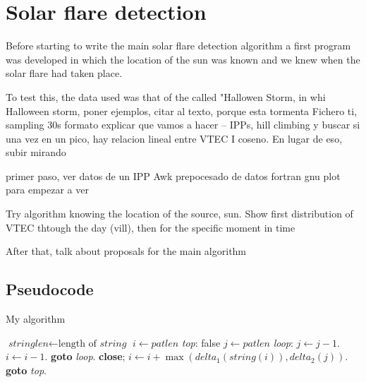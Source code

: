 \chapter{Solar flare detection}

Before starting to write the main solar flare detection algorithm a first program was developed in which the location of the sun was known and we knew when the solar flare had taken place.

To test this, the data used was that of the called "Hallowen Storm, in whi \\


Halloween storm, poner ejemplos, citar al texto, porque esta tormenta
Fichero ti, sampling 30s
formato
explicar que vamos a hacer – IPPs, hill climbing y buscar si una vez en un pico, hay relacion lineal entre VTEC I coseno. En lugar de eso, subir mirando

primer paso, ver datos de un IPP
Awk prepocesado de datos
fortran
gnu plot para empezar a ver






Try algorithm knowing the location of the source, sun. Show first distribution of VTEC thtough the day (vill), then for the specific moment in time

After that, talk about proposals for the main algorithm






\section{Pseudocode}

\begin{algorithm}
	\caption{My algorithm}\label{euclid}
	\begin{algorithmic}[1]
		\State $\textit{stringlen} \gets \text{length of }\textit{string}$
		\State $i \gets \textit{patlen}$
		\BState \emph{top}:
		 \Return false
		\EndIf
		\State $j \gets \textit{patlen}$
		\BState \emph{loop}:
		\State $j \gets j-1$.
		\State $i \gets i-1$.
		\State \textbf{goto} \emph{loop}.
		\State \textbf{close};
		\EndIf
		\State $i \gets i+\max(\textit{delta}_1(\textit{string}(i)),\textit{delta}_2(j))$.
		\State \textbf{goto} \emph{top}.
		\EndProcedure
	\end{algorithmic}
\end{algorithm}

